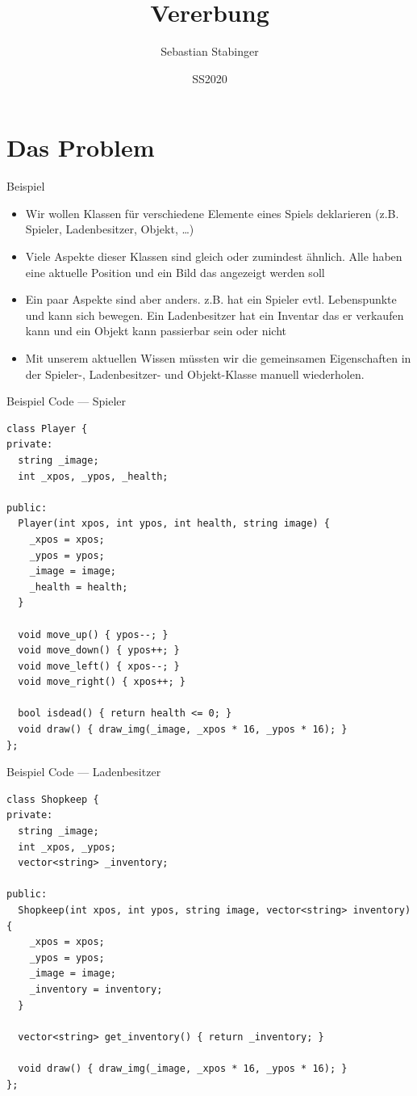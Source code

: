 \documentclass[presentation]{beamer}
\author{Sebastian Stabinger}
\date{SS2020}
\title{Vererbung}
\begin{document}
\maketitle
\section{Das Problem}
\label{sec:org2b7195e}
\begin{frame}[label={sec:org4088d6e}]{Beispiel}
\begin{itemize}
\item Wir wollen Klassen für verschiedene Elemente eines Spiels
deklarieren (z.B. Spieler, Ladenbesitzer, Objekt, \ldots{})
\item Viele Aspekte dieser Klassen sind gleich oder zumindest ähnlich.
Alle haben eine aktuelle Position und ein Bild das angezeigt werden
soll
\item Ein paar Aspekte sind aber anders. z.B. hat ein Spieler evtl.
Lebenspunkte und kann sich bewegen. Ein Ladenbesitzer hat ein
Inventar das er verkaufen kann und ein Objekt kann passierbar sein
oder nicht
\item Mit unserem aktuellen Wissen müssten wir die gemeinsamen
Eigenschaften in der Spieler-, Ladenbesitzer- und Objekt-Klasse
manuell wiederholen.
\end{itemize}
\end{frame}
\begin{frame}[fragile,label={sec:org224795d}]{Beispiel Code --- Spieler}
 \begin{verbatim}
class Player {
private:
  string _image;
  int _xpos, _ypos, _health;

public:
  Player(int xpos, int ypos, int health, string image) {
    _xpos = xpos;
    _ypos = ypos;
    _image = image;
    _health = health;
  }

  void move_up() { ypos--; }
  void move_down() { ypos++; }
  void move_left() { xpos--; }
  void move_right() { xpos++; }

  bool isdead() { return health <= 0; }
  void draw() { draw_img(_image, _xpos * 16, _ypos * 16); }
};
\end{verbatim}
\end{frame}
\begin{frame}[fragile,label={sec:org69592f9}]{Beispiel Code --- Ladenbesitzer}
 \begin{verbatim}
class Shopkeep {
private:
  string _image;
  int _xpos, _ypos;
  vector<string> _inventory;

public:
  Shopkeep(int xpos, int ypos, string image, vector<string> inventory) {
    _xpos = xpos;
    _ypos = ypos;
    _image = image;
    _inventory = inventory;
  }

  vector<string> get_inventory() { return _inventory; }

  void draw() { draw_img(_image, _xpos * 16, _ypos * 16); }
};
\end{verbatim}
\end{frame}
\end{document}
